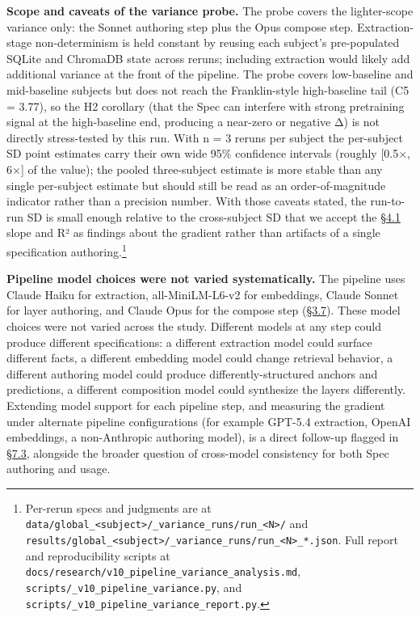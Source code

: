\textbf{Scope and caveats of the variance probe.} The probe covers the
lighter-scope variance only: the Sonnet authoring step plus the Opus
compose step. Extraction-stage non-determinism is held constant by
reusing each subject's pre-populated SQLite and ChromaDB state across
reruns; including extraction would likely add additional variance at the
front of the pipeline. The probe covers low-baseline and mid-baseline
subjects but does not reach the Franklin-style high-baseline tail (C5 =
3.77), so the H2 corollary (that the Spec can interfere with strong
pretraining signal at the high-baseline end, producing a near-zero or
negative Δ) is not directly stress-tested by this run. With n = 3 reruns
per subject the per-subject SD point estimates carry their own wide 95\%
confidence intervals (roughly {[}0.5×, 6×{]} of the value); the pooled
three-subject estimate is more stable than any single per-subject
estimate but should still be read as an order-of-magnitude indicator
rather than a precision number. With those caveats stated, the
run-to-run SD is small enough relative to the cross-subject SD that we
accept the \hyperref[the-cross-subject-gradient-and-its-per-question-mechanism]{§4.1} slope and R² as findings about the gradient rather than
artifacts of a single specification authoring.\footnote{Per-rerun specs
  and judgments are at
  \texttt{data/global\_\textless{}subject\textgreater{}/\_variance\_runs/run\_\textless{}N\textgreater{}/}
  and
  \texttt{results/global\_\textless{}subject\textgreater{}/\_variance\_runs/run\_\textless{}N\textgreater{}\_*.json}.
  Full report and reproducibility scripts at
  \texttt{docs/research/v10\_pipeline\_variance\_analysis.md},
  \texttt{scripts/\_v10\_pipeline\_variance.py}, and
  \texttt{scripts/\_v10\_pipeline\_variance\_report.py}.}

\textbf{Pipeline model choices were not varied systematically.} The
pipeline uses Claude Haiku for extraction, all-MiniLM-L6-v2 for
embeddings, Claude Sonnet for layer authoring, and Claude Opus for the
compose step (\hyperref[pipeline-for-the-behavioral-specification]{§3.7}). These model choices were not varied across the
study. Different models at any step could produce different
specifications: a different extraction model could surface different
facts, a different embedding model could change retrieval behavior, a
different authoring model could produce differently-structured anchors
and predictions, a different composition model could synthesize the
layers differently. Extending model support for each pipeline step, and
measuring the gradient under alternate pipeline configurations (for
example GPT-5.4 extraction, OpenAI embeddings, a non-Anthropic authoring
model), is a direct follow-up flagged in \hyperref[specification-design-and-composition]{§7.3}, alongside the broader
question of cross-model consistency for both Spec authoring and usage.

